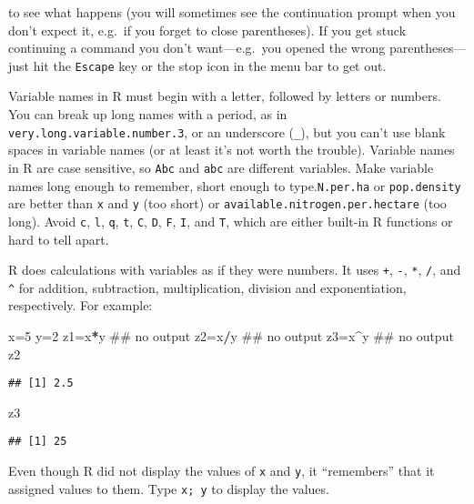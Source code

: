 \documentclass[11pt,]{article}
\newenvironment{Shaded}{\begin{snugshade}}{\end{snugshade}}
\newcommand{\DecValTok}[1]{\textcolor[rgb]{0.00,0.00,0.81}{#1}}
\newcommand{\OperatorTok}[1]{\textcolor[rgb]{0.81,0.36,0.00}{\textbf{#1}}}
\newcommand{\NormalTok}[1]{#1}
\begin{document}
to see what happens (you will sometimes see the continuation prompt when
you don't expect it, e.g.~if you forget to close parentheses). If you
get stuck continuing a command you don't want---e.g.~you opened the
wrong parentheses---just hit the \texttt{Escape} key or the stop icon in
the menu bar to get out.

Variable names in R must begin with a letter, followed by letters or
numbers. You can break up long names with a period, as in
\texttt{very.long.variable.number.3}, or an underscore (\texttt{\_}),
but you can't use blank spaces in variable names (or at least it's not
worth the trouble). Variable names in R are case sensitive, so
\texttt{Abc} and \texttt{abc} are different variables. Make variable
names long enough to remember, short enough to type.\texttt{N.per.ha} or
\texttt{pop.density} are better than \texttt{x} and \texttt{y} (too
short) or \texttt{available.nitrogen.per.hectare} (too long). Avoid
\texttt{c}, \texttt{l}, \texttt{q}, \texttt{t}, \texttt{C}, \texttt{D},
\texttt{F}, \texttt{I}, and \texttt{T}, which are either built-in R
functions or hard to tell apart.

R does calculations with variables as if they were numbers. It uses
\texttt{+}, \texttt{-}, \texttt{*}, \texttt{/}, and \texttt{\^{}} for
addition, subtraction, multiplication, division and exponentiation,
respectively. For example:

\begin{Shaded}
\begin{Highlighting}[]
\NormalTok{x=}\DecValTok{5}
\NormalTok{y=}\DecValTok{2}
\NormalTok{z1=x}\OperatorTok{*}\NormalTok{y ## no output}
\NormalTok{z2=x}\OperatorTok{/}\NormalTok{y ## no output}
\NormalTok{z3=x}\OperatorTok{^}\NormalTok{y ## no output}
\NormalTok{z2}
\end{Highlighting}
\end{Shaded}

\begin{verbatim}
## [1] 2.5
\end{verbatim}

\begin{Shaded}
\begin{Highlighting}[]
\NormalTok{z3}
\end{Highlighting}
\end{Shaded}

\begin{verbatim}
## [1] 25
\end{verbatim}

Even though R did not display the values of \texttt{x} and \texttt{y},
it ``remembers'' that it assigned values to them. Type \texttt{x;\ y} to
display the values.
\end{document}
